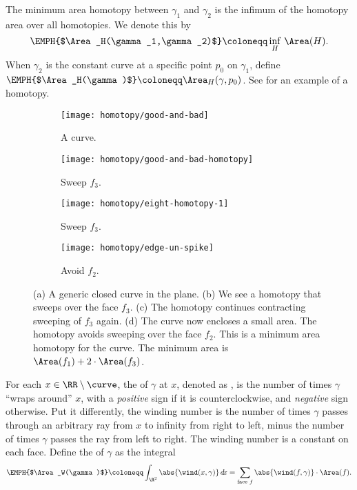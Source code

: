  The minimum area homotopy between $\gamma_1$ and $\gamma_2$ is the infimum of
  the homotopy area over all homotopies.
 We denote this by
 \[
     \EMPH{$\Area_H(\gamma_1,\gamma_2)$} \coloneqq \inf_{H} \, \Area(H).
 \]
 When $\gamma_2$ is the constant curve at a specific point $p_0$ on $\gamma_1$, 
 define $\EMPH{$\Area_H(\gamma)$} \coloneqq \Area_H(\gamma,p_0)$.
 See  for an example of a homotopy.


 \begin{figure}[htb]
         \centering
        \begin{subfigure}[b]{0.15\textwidth}
         \texttt{[image: homotopy/good-and-bad]}
         \caption{A curve.}
 	 \label{fig:homotopy}
       \end{subfigure}
         \hspace{1cm}
         \begin{subfigure}[b]{0.15\textwidth}
         \texttt{[image: homotopy/good-and-bad-homotopy]}
         \caption{Sweep $f_3$.}
         \end{subfigure}
          \hspace{1cm}
            \begin{subfigure}[b]{0.15\textwidth}
        \texttt{[image: homotopy/eight-homotopy-1]}
         \caption{Sweep $f_3$.}
 	 \label{fig:continue}
         \end{subfigure}
         \hspace{1cm}
         \begin{subfigure}[b]{0.15\textwidth}
        \texttt{[image: homotopy/edge-un-spike]}
         \caption{Avoid $f_2$.}
          \label{fig:un-spiked}
        \end{subfigure}
		\caption{(a) A generic closed curve in the plane.
 		(b) We see a homotopy that sweeps over the face $f_3$.
 		(c) The homotopy continues contracting sweeping of $f_3$ again.
 		(d) The curve now encloses a small area.
		The homotopy avoids sweeping over the face $f_2$.
 		This is a minimum area homotopy for the curve.
 		The minimum area is $\Area(f_1) + 2\cdot\Area(f_3)$.
 		\label{fig:eight}}
 \end{figure}


 For each $x\in \RR \setminus \curve$, the  of $\gamma$ at $x$, 
 denoted as , is the number of times $\gamma$ ``wraps around'' $x$,
  with a \emph{positive} sign if it is counterclockwise, and \emph{negative} sign otherwise.
Put it differently, the winding number is the number of times $\gamma$ passes through an 
arbitrary ray from $x$ to infinity from right to left, minus the number of times $\gamma$ 
passes the ray from left to right.
The winding number is a constant on each face.
 Define the  of $\gamma$ as the integral
 \[
 \EMPH{$\Area_W(\gamma)$} \coloneqq \int_{\R^2} \abs{\wind(x,\gamma)} \, d\!x
 = \sum_{\text{face $f$}} \abs{\wind(f,\gamma)} \cdot \Area(f).
 \]


